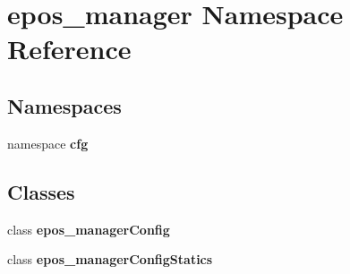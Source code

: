 \section{epos\-\_\-manager \-Namespace \-Reference}
\label{namespaceepos__manager}
\subsection*{\-Namespaces}
\begin{DoxyCompactItemize}
\item 
namespace {\bf cfg}
\end{DoxyCompactItemize}
\subsection*{\-Classes}
\begin{DoxyCompactItemize}
\item 
class {\bf epos\-\_\-manager\-Config}
\item 
class {\bf epos\-\_\-manager\-Config\-Statics}
\end{DoxyCompactItemize}
